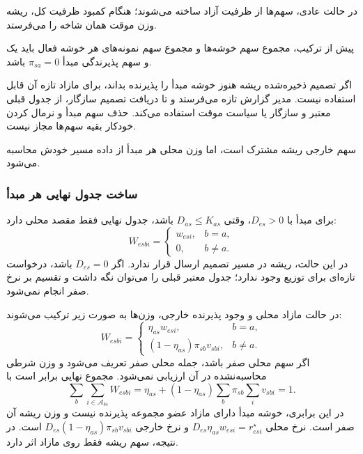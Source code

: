 در حالت عادی، سهم‌ها از ظرفیت آزاد ساخته می‌شوند؛ هنگام کمبود ظرفیت کل، ریشه وزن موقت همان شاخه را می‌فرستد.

پیش از ترکیب، مجموع سهم خوشه‌ها و مجموع سهم نمونه‌های هر خوشه فعال باید یک و سهم پذیرندگی مبدأ $\pi_{sa}=0$ باشد.

اگر تصمیم ذخیره‌شده ریشه هنوز خوشه مبدأ را پذیرنده بداند، برای مازاد تازه آن قابل استفاده نیست. مدیر گزارش تازه می‌فرستد و تا دریافت تصمیم سازگار، از جدول قبلی معتبر و سازگار یا سیاست موقت استفاده می‌کند. حذف سهم مبدأ و نرمال کردن خودکار بقیه سهم‌ها مجاز نیست.

سهم خارجی ریشه مشترک است، اما وزن محلی هر مبدأ از داده مسیر خودش محاسبه می‌شود.

\subsubsection{ساخت جدول نهایی هر مبدأ}

برای مبدأ با $D_{es}>0$، وقتی $D_{as}\leq K_{as}$ باشد، جدول نهایی فقط مقصد محلی دارد:
\begin{equation}
 W_{esbi}=\begin{cases}w_{esi},&b=a,\\0,&b\ne a.\end{cases}
 \label{eq:local-only-final}
\end{equation}
در این حالت، ریشه در مسیر تصمیم ارسال قرار ندارد. اگر $D_{es}=0$ باشد، درخواست تازه‌ای برای توزیع وجود ندارد؛ جدول معتبر قبلی را می‌توان نگه داشت و تقسیم بر نرخ صفر انجام نمی‌شود.

در حالت مازاد محلی و وجود پذیرنده خارجی، وزن‌ها به صورت زیر ترکیب می‌شوند:
\begin{equation}
 W_{esbi}=\begin{cases}
 \eta_{as}w_{esi},&b=a,\\
 (1-\eta_{as})\pi_{sb}v_{sbi},&b\ne a.
 \end{cases}
 \label{eq:integrated-final}
\end{equation}
اگر سهم محلی صفر باشد، جمله محلی صفر تعریف می‌شود و وزن شرطی محاسبه‌نشده در آن ارزیابی نمی‌شود. مجموع نهایی برابر است با
\begin{equation}
 \sum_b\sum_{i\in\mathcal A_{bs}}W_{esbi}
 =\eta_{as}+(1-\eta_{as})\sum_b\pi_{sb}\sum_i v_{sbi}=1.
 \label{eq:final-normalization}
\end{equation}
در این برابری، خوشه مبدأ دارای مازاد عضو مجموعه پذیرنده نیست و وزن ریشه آن صفر است. نرخ محلی $D_{es}\eta_{as}w_{esi}=r_{esi}^{\star}$ و نرخ خارجی $D_{es}(1-\eta_{as})\pi_{sb}v_{sbi}$ است. در نتیجه، سهم ریشه فقط روی مازاد اثر دارد.

